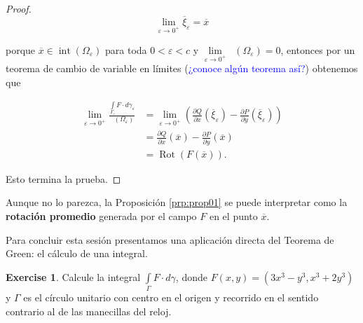 \documentclass[
]{krantz}
\theoremstyle{definition}
\renewcommand{\epsilon}{\varepsilon}  %
\theoremstyle{definition}
\theoremstyle{definition}
\theoremstyle{definition}
\newtheorem{exercise}{Exercise}[chapter]
\theoremstyle{remark}
\begin{document}
\begin{proof}
\begin{equation*}
        \lim\limits_{\epsilon\to 0^{+}} \overline{\xi}_{\epsilon} = \overline{x}
\end{equation*}

porque \(\overline{x}\in\mathop{\mathrm{int}}\left(\Omega_{\epsilon}\right)\) para toda \(0<\epsilon < c\) y \(\lim\limits_{\epsilon\to 0^{+}} \mathop{\mathrm{di\acute{a}m}}\left(\Omega_{\epsilon}\right)=0\), entonces por un teorema de cambio de variable en límites (\textcolor{blue}{¿conoce algún teorema así?}) obtenemos que

\begin{align*}
        \displaystyle\lim\limits_{\epsilon\to 0^{+}} \frac{\displaystyle\int\limits_{\Gamma_{\epsilon}} F\cdot d\gamma_{\epsilon}}{\mathop{\mathrm{\acute{a}rea}}\left(\Omega_{\epsilon}\right)}  & = \lim\limits_{\epsilon\to 0^{+}}\left(\frac{\partial Q}{\partial x}\left(\overline{\xi}_{\epsilon}\right) - \frac{\partial P}{\partial y}\left( \overline{\xi}_{\epsilon}\right)\right) \\
        & = \frac{\partial Q}{\partial x}\left(\overline{x}\right) - \frac{\partial P}{\partial y}\left(\overline{x}\right) \\
        & = \mathop{\mathrm{Rot}}\left( F(\overline{x})\right).
\end{align*}

Esto termina la prueba.

\end{proof}

Aunque no lo parezca, la Proposición \ref{prp:prop01} se puede interpretar como la \textbf{rotación promedio} generada por el campo \(F\) en el punto \(\overline{x}\).

Para concluir esta sesión presentamos una aplicación directa del Teorema de Green: el cálculo de una integral.

\begin{exercise}
\protect\hypertarget{exr:ej01}{}{\label{exr:ej01} } Calcule la integral \(\displaystyle\int\limits_{\Gamma} F\cdot d\gamma\), donde \(F(x,y) = \left(3x^3-y^3, x^3 +2y^3\right)\) y \(\Gamma\) es el círculo unitario con centro en el origen y recorrido en el sentido contrario al de las manecillas del reloj.
\end{exercise}
\end{document}
